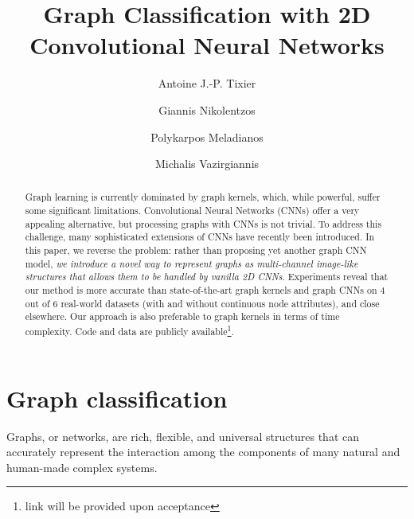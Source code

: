 \documentclass[sigconf]{acmart}
\begin{document}
\title{Graph Classification with 2D Convolutional Neural Networks}

\author{Antoine J.-P. Tixier}

\author{Giannis Nikolentzos}

\author{Polykarpos Meladianos}

\author{Michalis Vazirgiannis}

\begin{abstract}
Graph learning is currently dominated by graph kernels, which, while powerful, suffer some significant limitations. Convolutional Neural Networks (CNNs) offer a very appealing alternative, but processing graphs with CNNs is not trivial. To address this challenge, many sophisticated extensions of CNNs have recently been introduced. In this paper, we reverse the problem: rather than proposing yet another graph CNN model, \textit{we introduce a novel way to represent graphs as multi-channel image-like structures that allows them to be handled by vanilla 2D CNNs}. 
Experiments reveal that our method is more accurate than state-of-the-art graph kernels and graph CNNs on 4 out of 6 real-world datasets (with and without continuous node attributes), and close elsewhere. Our approach is also preferable to graph kernels in terms of time complexity. Code and data are publicly available\footnote{\scriptsize{link will be provided upon acceptance}}.
\end{abstract}


\maketitle

\section{Graph classification}
Graphs, or networks, are rich, flexible, and universal structures that can accurately represent the interaction among the components of many natural and human-made complex systems.
\end{document}
